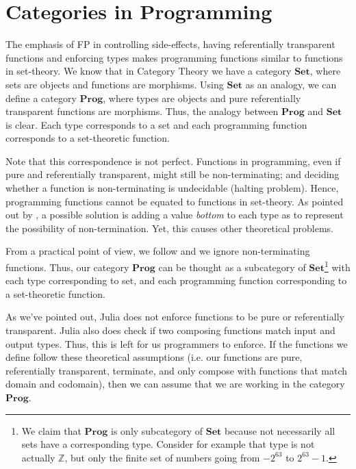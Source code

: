 \section{Categories in Programming}

The emphasis of FP in controlling side-effects,
having referentially transparent functions and enforcing types
makes programming functions similar to functions in set-theory.
We know that in Category Theory we have a category $\mathbf{Set}$,
where sets are objects and functions are morphisms. Using $\mathbf{Set}$
as an analogy, we can define a category $\mathbf{Prog}$, where
types are objects and pure referentially transparent functions are morphisms.
Thus, the analogy between $\mathbf{Prog}$ and $\mathbf{Set}$ is clear.
Each type corresponds to a set and each programming function corresponds to a set-theoretic function.

Note that this correspondence is not perfect.
Functions in programming, even if pure and referentially transparent,
might still be non-terminating; and deciding whether a function is non-terminating is undecidable (halting problem).
Hence, programming functions cannot be equated to functions in set-theory. As pointed out by
\citet{milewski2018category}, a possible solution is adding a value \textit{bottom}
to each type as to represent the possibility of non-termination. Yet, this causes other
theoretical problems.

From a practical point of view, we follow \citet{milewski2018category} and we ignore
non-terminating functions. Thus, our category $\mathbf{Prog}$ can be thought as a
subcategory of $\mathbf{Set}$\footnote{We claim that $\mathbf{Prog}$ is only subcategory
of $\mathbf{Set}$ because not necessarily all sets have a corresponding type. Consider
for example that type  is not actually $\mathbb Z$, but only the finite set
of numbers going from $-2^{63}$ to $2^{63}-1$.} with each type corresponding to set, and each programming function
corresponding to a set-theoretic function.

As we've pointed out, Julia does not enforce functions to be pure or referentially transparent.
Julia also does check if two composing functions match input and output types. Thus, this is left
for us programmers to enforce. If the functions we define follow these theoretical assumptions
(i.e. our functions are pure, referentially transparent, terminate, and
only compose with functions that match domain and codomain), then we can assume that
we are working in the category $\mathbf{Prog}$.

